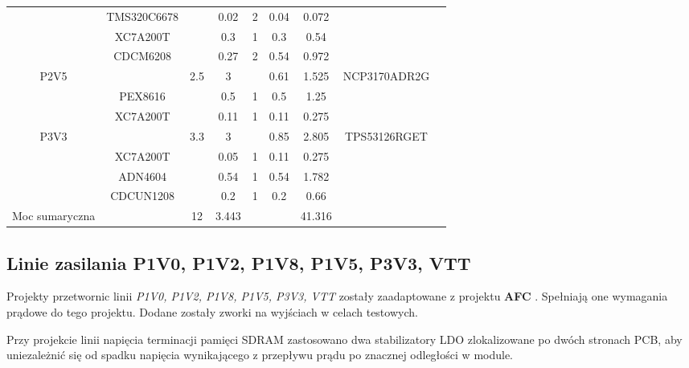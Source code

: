 \begin{sidewaystable}
\begin{tabular}{| c| c| c | c | c | c | c | c | c}
     \hline
			& 	TMS320C6678	&		& 	0.02 	&	2 	&	0.04	&	0.072	&					\\
			& 	XC7A200T 		&		& 	0.3 	&	1	&	0.3	&	0.54	&					\\
			& 	CDCM6208		&		& 	0.27 	&	2 	&	0.54	&	0.972	&					\\
     \hline
    P2V5		& 				&	2.5	&	3	&		& 	0.61	& 	1.525	& 	NCP3170ADR2G		\\
     \hline
			& 	PEX8616		&		& 	0.5 	&	1 	&	0.5	&	1.25	&					\\
			& 	XC7A200T		&		& 	0.11 	&	1 	&	0.11	&	0.275	&					\\
     \hline
    P3V3		& 				&	3.3	&	3	&		& 	0.85	& 	2.805	& 	TPS53126RGET		\\
     \hline
			& 	XC7A200T		&		& 	0.05 	&	1 	&	0.11	&	0.275	&					\\
			& 	ADN4604		&		& 	0.54	&	1 	&	0.54	&	1.782	&					\\
			& 	CDCUN1208		&		& 	0.2 	&	1 	&	0.2	&	0.66	&					\\
     \hline
     \hline
    Moc sumaryczna		& 			&	12 	&	3.443 &		& 	   	& 	41.316	& 		\\
     \hline
    \end{tabular}

	\label{tbl:dsp_power}
\end{sidewaystable}

\subsection{Linie zasilania P1V0, P1V2, P1V8, P1V5, P3V3, VTT}
Projekty przetwornic linii \textit{P1V0, P1V2, P1V8, P1V5, P3V3, VTT} zostały zaadaptowane z projektu \textbf{AFC} \cite{AFC}. Spełniają one wymagania prądowe do tego projektu. Dodane zostały zworki na wyjściach w celach testowych. 

Przy projekcie linii napięcia terminacji pamięci SDRAM zastosowano dwa stabilizatory LDO zlokalizowane po dwóch stronach PCB, aby uniezależnić się od spadku napięcia wynikającego z przepływu prądu po znacznej odległości w module. 

